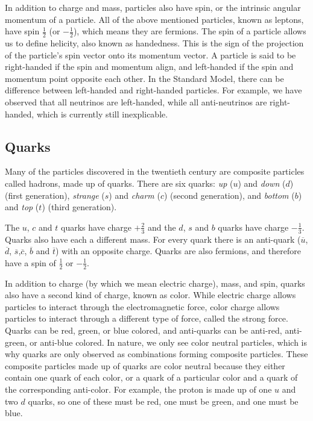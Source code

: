 In addition to charge and mass, particles also have spin, or the intrinsic angular momentum of a particle. All of the above mentioned particles, known as leptons, have spin $\frac{1}{2}$ (or $-\frac{1}{2}$), which means they are fermions. The spin of a particle allows us to define helicity, also known as handedness. This is the sign of the projection of the particle's spin vector onto its momentum vector. A particle is said to be right-handed if the spin and momentum align, and left-handed if the spin and momentum point opposite each other. In the Standard Model, there can be difference between left-handed and right-handed particles. For example, we have observed that all neutrinos are left-handed, while all anti-neutrinos are right-handed, which is currently still inexplicable.

\subsection{Quarks}
Many of the particles discovered in the twentieth century are composite particles called hadrons, made up of quarks. There are six quarks: \textit{up} ($u$) and \textit{down} ($d$) (first generation), \textit{strange} ($s$) and \textit{charm} ($c$) (second generation), and \textit{bottom} ($b$) and \textit{top} ($t$) (third generation).

The $u$, $c$ and $t$ quarks have charge $+\frac{2}{3}$ and the $d$, $s$ and $b$ quarks have charge $-\frac{1}{3}$. Quarks also have each a different mass. For every quark there is an anti-quark ($\overline{u}$, $\overline{d}$, $\overline{s}$,$\overline{c}$, $\overline{b}$ and $\overline{t}$) with an opposite charge. Quarks are also fermions, and therefore have a spin of $\frac{1}{2}$ or $-\frac{1}{2}$.

In addition to charge (by which we mean electric charge), mass, and spin, quarks also have a second kind of charge, known as color. While electric charge allows particles to interact through the electromagnetic force, color charge allows particles to interact through a different type of force, called the strong force. Quarks can be red, green, or blue colored, and anti-quarks can be anti-red, anti-green, or anti-blue colored. In nature, we only see color neutral particles, which is why quarks are only observed as combinations forming composite particles. These composite particles made up of quarks are color neutral because they either contain one quark of each color, or a quark of a particular color and a quark of the corresponding anti-color. For example, the proton is made up of one $u$ and two $d$ quarks, so one of these must be red, one must be green, and one must be blue.

